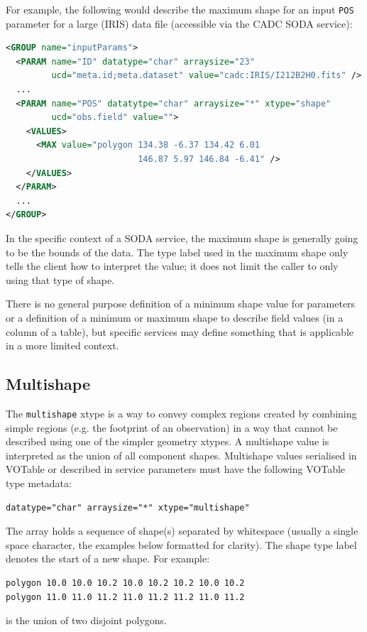 \documentclass[11pt,letter]{ivoa}
\begin{document}
For example, the following would describe the maximum shape for an input \verb|POS|
parameter for a large (IRIS) data file (accessible via the CADC SODA service):
\begin{lstlisting}[language=XML]
<GROUP name="inputParams">
  <PARAM name="ID" datatype="char" arraysize="23"
         ucd="meta.id;meta.dataset" value="cadc:IRIS/I212B2H0.fits" />
  ...
  <PARAM name="POS" datatytpe="char" arraysize="*" xtype="shape"
         ucd="obs.field" value="">
    <VALUES>
      <MAX value="polygon 134.38 -6.37 134.42 6.01
                          146.87 5.97 146.84 -6.41" />
    </VALUES>
  </PARAM>
  ...
</GROUP>
\end{lstlisting}
In the specific context of a SODA service, the maximum shape is generally going
to be the bounds of the data. The type label used in the maximum shape only tells
the client how to interpret the value; it does not limit the caller to only using
that type of shape.

There is no general purpose definition of a minimum shape value for parameters or
a definition of a minimum or maximum shape to describe field values (in a column
of a table), but specific services may define something that is applicable in a
more limited context.

\subsection{Multishape}
The \verb|multishape| xtype is a way to convey complex regions created by combining
simple regions (e.g. the footprint of an observation) in a way that cannot be described
using one of the simpler geometry xtypes. A multishape value is interpreted as the union
of all component shapes. Multishape values serialised in VOTable or described in service
parameters must have the following VOTable type metadata:

\begin{verbatim}
datatype="char" arraysize="*" xtype="multishape"
\end{verbatim}

\noindent
The array holds a sequence of shape(s) separated by whitespace (usually a single space
character, the examples below formatted for clarity). The shape type label denotes the
start of a new shape. For example:

\begin{verbatim}
polygon 10.0 10.0 10.2 10.0 10.2 10.2 10.0 10.2
polygon 11.0 11.0 11.2 11.0 11.2 11.2 11.0 11.2
\end{verbatim}
\noindent is the union of two disjoint polygons.
\end{document}
